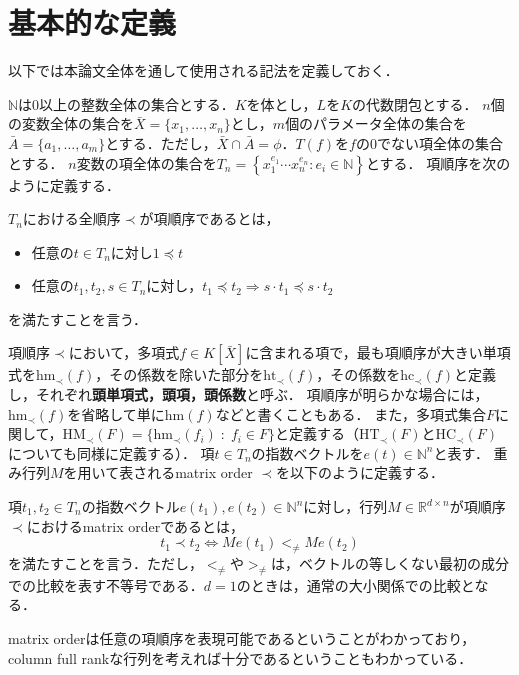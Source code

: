 \section{基本的な定義}
以下では本論文全体を通して使用される記法を定義しておく．
\par
$\mathbb{N}$は$0$以上の整数全体の集合とする．$K$を体とし，$L$を$K$の代数閉包とする．
$n$個の変数全体の集合を$\bar{X} = \{x_1, \dots, x_n\}$とし，$m$個のパラメータ全体の集合を$\bar{A} = \{a_1, \dots, a_m\}$とする．ただし，$\bar{X}\cap \bar{A} = \phi$．$T(f)$を$f$の$0$でない項全体の集合とする．
$n$変数の項全体の集合を$T_n = \left\{ x_1^{e_1} \cdots x_n^{e_n} : e_i \in \mathbb{N} \right\}$とする．
項順序を次のように定義する．
\begin{definition}[項順序]
	$T_n$における全順序$\prec$が項順序であるとは，
	\begin{itemize}
		\item 任意の$t \in T_n$に対し$1 \preceq t$
		\item 任意の$t_1, t_2, s \in T_n$に対し，$t_1 \preceq t_2 \Longrightarrow s\cdot t_1 \preceq s\cdot t_2$
	\end{itemize}
	を満たすことを言う．
\end{definition}
項順序$\prec$において，多項式$f\in K[\bar{X}]$に含まれる項で，最も項順序が大きい単項式を$\mathrm{hm}_{\prec}(f)$，その係数を除いた部分を$\mathrm{ht}_{\prec}(f)$，その係数を$\mathrm{hc}_{\prec}(f)$と定義し，それぞれ\textbf{頭単項式，頭項，頭係数}と呼ぶ．
項順序が明らかな場合には，$\mathrm{hm}_{\prec}(f)$を省略して単に$\mathrm{hm}(f)$などと書くこともある．
また，多項式集合$F$に関して，$\mathrm{HM}_{\prec}(F) = \{ \mathrm{hm}_{\prec}(f_i) \;:\; f_i \in F \}$と定義する（$\mathrm{HT}_{\prec}(F)\text{と}\mathrm{HC}_{\prec}(F)$についても同様に定義する）．
項$t \in T_n$の指数ベクトルを$e(t) \in \mathbb{N}^{n}$と表す．
重み行列$M$を用いて表されるmatrix order $\prec$を以下のように定義する．
\begin{definition}
	項$t_1, t_2 \in T_n$の指数ベクトル$e(t_1), e(t_2) \in \mathbb{N}^{n}$に対し，行列$M \in \mathbb{R}^{d\times n}$が項順序$\prec$におけるmatrix orderであるとは，
	$$t_1 \prec t_2 \Longleftrightarrow Me(t_1) <_{\ne} Me(t_2)$$
	を満たすことを言う．ただし，$<_{\ne}$や$>_{\ne}$は，ベクトルの等しくない最初の成分での比較を表す不等号である．$d=1$のときは，通常の大小関係での比較となる．
\end{definition}
matrix orderは任意の項順序を表現可能である\cite{MR826583}ということがわかっており，column full rankな行列を考えれば十分であるということもわかっている．

